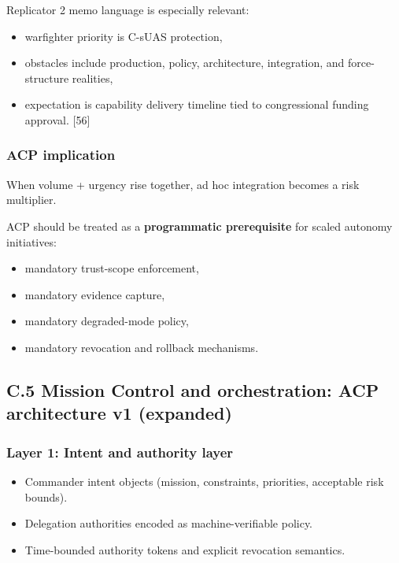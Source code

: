 \documentclass[
]{article}
\providecommand{\tightlist}{%
  \setlength{\itemsep}{0pt}\setlength{\parskip}{0pt}}
\begin{document}
Replicator 2 memo language is especially relevant:

\begin{itemize}
\tightlist
\item
  warfighter priority is C-sUAS protection,
\item
  obstacles include production, policy, architecture, integration, and
  force-structure realities,
\item
  expectation is capability delivery timeline tied to congressional
  funding approval. {[}56{]}
\end{itemize}

\hypertarget{acp-implication-2}{%
\subsubsection{ACP implication}\label{acp-implication-2}}

When volume + urgency rise together, ad hoc integration becomes a risk
multiplier.

ACP should be treated as a \textbf{programmatic prerequisite} for scaled
autonomy initiatives:

\begin{itemize}
\tightlist
\item
  mandatory trust-scope enforcement,
\item
  mandatory evidence capture,
\item
  mandatory degraded-mode policy,
\item
  mandatory revocation and rollback mechanisms.
\end{itemize}

\hypertarget{c.5-mission-control-and-orchestration-acp-architecture-v1-expanded}{%
\subsection{C.5 Mission Control and orchestration: ACP architecture v1
(expanded)}\label{c.5-mission-control-and-orchestration-acp-architecture-v1-expanded}}

\hypertarget{layer-1-intent-and-authority-layer}{%
\subsubsection{Layer 1: Intent and authority
layer}\label{layer-1-intent-and-authority-layer}}

\begin{itemize}
\tightlist
\item
  Commander intent objects (mission, constraints, priorities, acceptable
  risk bounds).
\item
  Delegation authorities encoded as machine-verifiable policy.
\item
  Time-bounded authority tokens and explicit revocation semantics.
\end{itemize}
\end{document}

